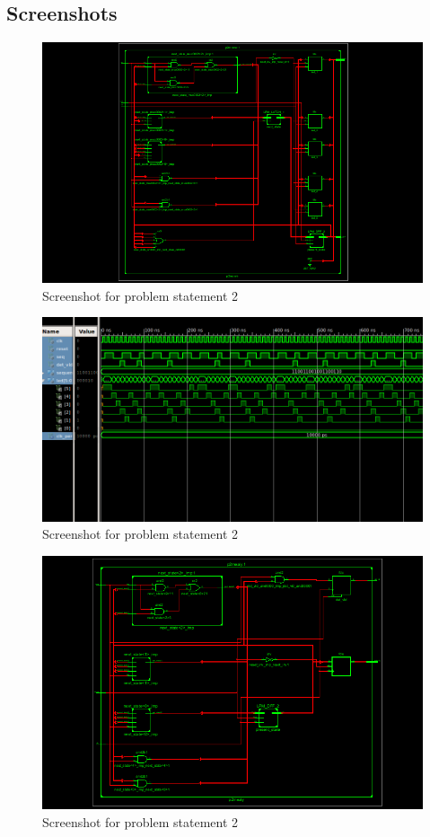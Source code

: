 \documentclass[11pt]{report}
\begin{document}
\subsection{Screenshots}
	\begin{figure}[h!]
	\centering
	\includegraphics[scale=0.8, center]{images/screenshot21}
	\caption{Screenshot for problem statement 2}
	\end{figure}
	\pagebreak
	\begin{figure}[h!]
	\centering
	\includegraphics[scale=0.8, center]{images/screenshot22}
	\caption{Screenshot for problem statement 2}
	\end{figure}
	\pagebreak
	\begin{figure}[h!]
	\centering
	\includegraphics[scale=0.8, center]{images/screenshot23}
	\caption{Screenshot for problem statement 2}
	\end{figure}
\end{document}
